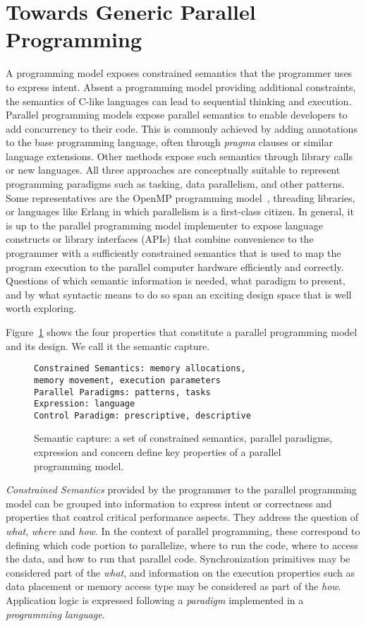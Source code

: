 \section{Towards Generic Parallel Programming}\label{chap:background}

A programming model exposes constrained semantics that the programmer uses to express intent. Absent a programming model providing additional constraints, the semantics of C-like languages can lead to sequential thinking and execution. Parallel programming models expose parallel semantics to enable developers to add concurrency to their code. This is commonly achieved by adding annotations to the base programming language, often through \emph{pragma} clauses or similar language extensions. Other methods expose such semantics through library calls or new languages. All three approaches are conceptually suitable to represent programming paradigms such as tasking, data parallelism, and other patterns. Some representatives are the OpenMP programming model~\cite{OPENMP}, threading libraries, or languages like Erlang\cite{ERLANG} in which parallelism is a first-class citizen. In general, it is up to the parallel programming model implementer to expose language constructs or library interfaces (APIs) that combine convenience to the programmer with a sufficiently constrained semantics that is used to map the program execution to the parallel computer hardware efficiently and correctly. Questions of which semantic information is needed, what paradigm to present, and by what syntactic means to do so span an exciting design space that is well worth exploring.

 Figure~\ref{figSemCapture} shows the four properties that constitute a parallel programming model and its design. We call it the semantic capture.

\begin{figure}[h]
\begin{verbatim}
Constrained Semantics: memory allocations, 
memory movement, execution parameters
Parallel Paradigms: patterns, tasks
Expression: language 
Control Paradigm: prescriptive, descriptive
\end{verbatim}
\caption{Semantic capture: a set of constrained semantics, parallel paradigms, expression and concern define key properties of a parallel programming model.}
\label{figSemCapture}
\end{figure}

\emph{Constrained Semantics} provided by the programmer to the parallel programming model can be grouped into information to express intent or correctness and properties that control critical performance aspects. They address the question of \emph{what}, \emph{where} and \emph{how}. In the context of parallel programming, these correspond to defining which code portion to parallelize, where to run the code, where to access the data, and how to run that parallel code. Synchronization primitives may be considered part of the \emph{what}, and information on the execution properties such as data placement or memory access type may be considered as part of the \emph{how}. Application logic is expressed following a \emph{paradigm} implemented in a \emph{programming language}.

